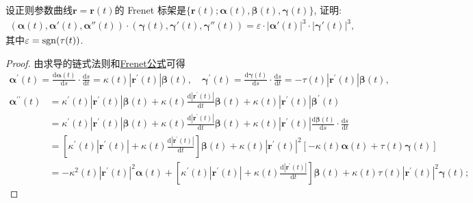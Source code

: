 \documentclass[../../main.tex]{subfiles}%
\begin{document}
\begin{example}
设正则参数曲线$\bm{r} = \bm{r}(t)$的 Frenet 标架是$\{\bm{r}(t); \bm{\alpha}(t), \bm{\beta}(t), \bm{\gamma}(t)\}$, 证明:
\begin{align*}
(\bm{\alpha}(t), \bm{\alpha}'(t), \bm{\alpha}''(t)) \cdot (\bm{\gamma}(t), \bm{\gamma}'(t), \bm{\gamma}''(t)) = \varepsilon \cdot |\bm{\alpha}'(t)|^3 \cdot |\bm{\gamma}'(t)|^3,
\end{align*}
其中$\varepsilon = \operatorname{\operatorname{sgn}}(\tau(t))$.
\end{example}
\begin{proof}
由求导的链式法则和\hyperref[theorem:微分几何-Frenet公式]{Frenet公式}可得
\begin{align*}
\bm{\alpha}^\prime\left(t\right)=\frac{\mathrm{d}\bm{\alpha}\left(t\right)}{\mathrm{d}s}\cdot\frac{\mathrm{d}s}{\mathrm{d}t}=\kappa\left(t\right)\left|\bm{r}^\prime\left(t\right)\right|\bm{\beta}\left(t\right),
\quad 
\bm{\gamma}^\prime\left(t\right)=\frac{\mathrm{d}\bm{\gamma}\left(t\right)}{\mathrm{d}s}\cdot\frac{\mathrm{d}s}{\mathrm{d}t}=-\tau\left(t\right)\left|\bm{r}^\prime\left(t\right)\right|\bm{\beta}\left(t\right),
\end{align*}
\begin{align*}
\bm{\alpha}^{\prime\prime}\left(t\right)&=\kappa^\prime\left(t\right)\left|\bm{r}^\prime\left(t\right)\right|\bm{\beta}\left(t\right)+\kappa\left(t\right)\frac{\mathrm{d}\left|\bm{r}^\prime\left(t\right)\right|}{\mathrm{d}t}\bm{\beta}\left(t\right)+\kappa\left(t\right)\left|\bm{r}^\prime\left(t\right)\right|\bm{\beta}^\prime\left(t\right)\\
&=\kappa^\prime\left(t\right)\left|\bm{r}^\prime\left(t\right)\right|\bm{\beta}\left(t\right)+\kappa\left(t\right)\frac{\mathrm{d}\left|\bm{r}^\prime\left(t\right)\right|}{\mathrm{d}t}\bm{\beta}\left(t\right)+\kappa\left(t\right)\left|\bm{r}^\prime\left(t\right)\right|\frac{\mathrm{d}\bm{\beta}\left(t\right)}{\mathrm{d}s}\cdot\frac{\mathrm{d}s}{\mathrm{d}t}\\
&=\left[\kappa^\prime\left(t\right)\left|\bm{r}^\prime\left(t\right)\right|+\kappa\left(t\right)\frac{\mathrm{d}\left|\bm{r}^\prime\left(t\right)\right|}{\mathrm{d}t}\right]\bm{\beta}\left(t\right)+\kappa\left(t\right)\left|\bm{r}^\prime\left(t\right)\right|^2\left[-\kappa\left(t\right)\bm{\alpha}\left(t\right)+\tau\left(t\right)\bm{\gamma}\left(t\right)\right]\\
&=-\kappa^2\left(t\right)\left|\bm{r}^\prime\left(t\right)\right|^2\bm{\alpha}\left(t\right)+\left[\kappa^\prime\left(t\right)\left|\bm{r}^\prime\left(t\right)\right|+\kappa\left(t\right)\frac{\mathrm{d}\left|\bm{r}^\prime\left(t\right)\right|}{\mathrm{d}t}\right]\bm{\beta}\left(t\right)+\kappa\left(t\right)\tau\left(t\right)\left|\bm{r}^\prime\left(t\right)\right|^2\bm{\gamma}\left(t\right);

\end{align*}
\end{proof}
\end{document}
